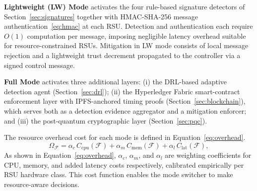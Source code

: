 \textbf{Lightweight (LW) Mode} activates the four rule-based signature
detectors of Section~\ref{sec:signatures} together with HMAC-SHA-256
message authentication~\eqref{eq:hmac} at each RSU. Detection and
authentication each require $O(1)$ computation per message, imposing
negligible latency overhead suitable for resource-constrained RSUs.
Mitigation in LW mode consists of local message rejection and a
lightweight trust decrement propagated to the controller via a signed
control message.

\textbf{Full Mode} activates three additional layers: (i) the
DRL-based adaptive detection agent (Section~\ref{sec:drl}); (ii) the
Hyperledger Fabric smart-contract enforcement layer with IPFS-anchored
timing proofs (Section~\ref{sec:blockchain}), which serves both as a
detection evidence aggregator and a mitigation enforcer; and (iii) the
post-quantum cryptographic layer (Section~\ref{sec:pqc}).

The resource overhead cost for each mode is defined in
Equation~\eqref{eq:overhead}.
\begin{equation}
\Omega_{\mathcal{F}} =
  \alpha_c\,C_{\mathrm{cpu}}(\mathcal{F}) +
  \alpha_m\,C_{\mathrm{mem}}(\mathcal{F}) +
  \alpha_l\,C_{\mathrm{lat}}(\mathcal{F}),
\label{eq:overhead}
\end{equation}
As shown in Equation~\eqref{eq:overhead}, $\alpha_c$,
$\alpha_m$, and $\alpha_l$ are weighting coefficients for
CPU, memory, and added latency costs respectively, calibrated
empirically per RSU hardware class. This cost function
enables the mode switcher to make resource-aware decisions.


